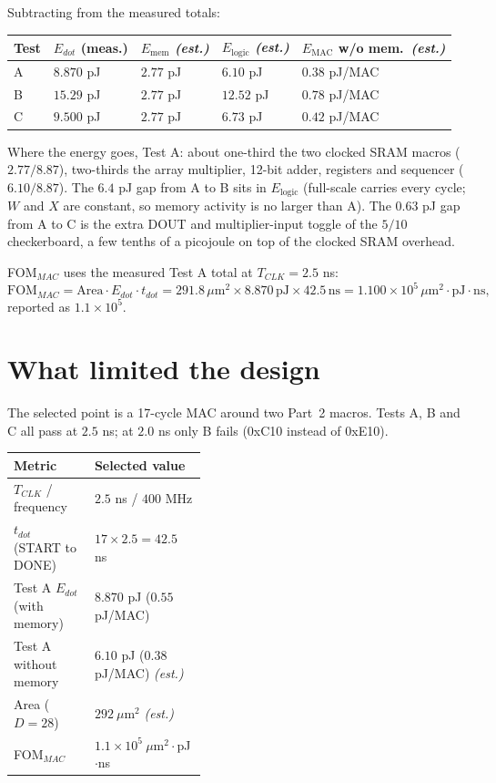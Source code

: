 \documentclass[10pt,letterpaper]{article}
\renewcommand{\arraystretch}{1.32}
\newcommand{\est}{\textit{(est.)}}
\begin{document}
Subtracting from the measured totals:
\begin{center}\small\begin{tabularx}{\linewidth}{@{}l l l l L@{}}\toprule
Test & $E_{dot}$ (meas.) & $E_{\mathrm{mem}}$ \est & $E_{\mathrm{logic}}$ \est & $E_{\mathrm{MAC}}$ w/o mem.\ \est\\\midrule
A & $8.870$ pJ & $2.77$ pJ & $6.10$ pJ & $0.38$ pJ/MAC\\\addlinespace
B & $15.29$ pJ & $2.77$ pJ & $12.52$ pJ & $0.78$ pJ/MAC\\\addlinespace
C & $9.500$ pJ & $2.77$ pJ & $6.73$ pJ & $0.42$ pJ/MAC\\\bottomrule
\end{tabularx}\end{center}
Where the energy goes, Test A: about one-third the two clocked SRAM macros ($2.77/8.87$), two-thirds the array multiplier, 12-bit adder, registers and sequencer ($6.10/8.87$). The $6.4$ pJ gap from A to B sits in $E_{\mathrm{logic}}$ (full-scale carries every cycle; $W$ and $X$ are constant, so memory activity is no larger than A). The $0.63$ pJ gap from A to C is the extra DOUT and multiplier-input toggle of the $5/10$ checkerboard, a few tenths of a picojoule on top of the clocked SRAM overhead.

FOM$_{MAC}$ uses the measured Test A total at $T_{CLK}=2.5$ ns:
\[
\mathrm{FOM}_{MAC}
=\mathrm{Area}\cdot E_{dot}\cdot t_{dot}
=291.8\,\mu\mathrm{m}^{2}\times8.870\,\mathrm{pJ}\times42.5\,\mathrm{ns}
=1.100\times10^{5}\,\mu\mathrm{m}^{2}\cdot\mathrm{pJ}\cdot\mathrm{ns},
\]
reported as $1.1\times10^{5}$.

\clearpage
\section{What limited the design}\label{sec:limit}

The selected point is a 17-cycle MAC around two Part~2 macros. Tests A, B and C all pass at $2.5$ ns; at $2.0$ ns only B fails (0xC10 instead of 0xE10).

\begin{center}\small\renewcommand{\arraystretch}{1.45}%
\begin{tabularx}{\linewidth}{@{}P{0.42\linewidth}L@{}}\toprule
Metric & Selected value\\\midrule
$T_{CLK}$ / frequency & $2.5$ ns / $400$ MHz\\\addlinespace
$t_{dot}$ (START to DONE) & $17\times2.5=42.5$ ns\\\addlinespace[0.7em]
Test A $E_{dot}$ (with memory) & $8.870$ pJ ($0.55$ pJ/MAC)\\\addlinespace
Test A without memory & $6.10$ pJ ($0.38$ pJ/MAC) \est\\\addlinespace[0.7em]
Area ($D=28$) & $292\ \mu$m$^2$ \est\\\addlinespace
FOM$_{MAC}$ & $1.1\times10^{5}\ \mu$m$^2\cdot$pJ$\cdot$ns\\\bottomrule
\end{tabularx}\end{center}
\end{document}
